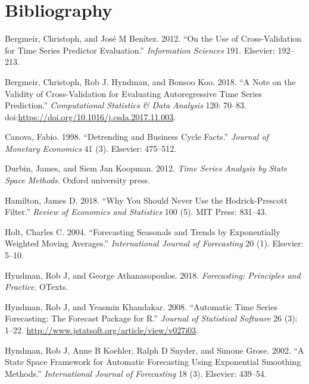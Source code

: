 \documentclass[]{article}
\begin{document}
\section*{Bibliography}\label{bibliography}

\hypertarget{refs}{}
\hypertarget{ref-bergmeir2012use}{}
Bergmeir, Christoph, and José M Benítez. 2012. ``On the Use of
Cross-Validation for Time Series Predictor Evaluation.''
\emph{Information Sciences} 191. Elsevier: 192--213.

\hypertarget{ref-bergmeir2018}{}
Bergmeir, Christoph, Rob J. Hyndman, and Bonsoo Koo. 2018. ``A Note on
the Validity of Cross-Validation for Evaluating Autoregressive Time
Series Prediction.'' \emph{Computational Statistics \& Data Analysis}
120: 70--83.
doi:\href{https://doi.org/https://doi.org/10.1016/j.csda.2017.11.003}{https://doi.org/10.1016/j.csda.2017.11.003}.

\hypertarget{ref-canova1998detrending}{}
Canova, Fabio. 1998. ``Detrending and Business Cycle Facts.''
\emph{Journal of Monetary Economics} 41 (3). Elsevier: 475--512.

\hypertarget{ref-durbin2012time}{}
Durbin, James, and Siem Jan Koopman. 2012. \emph{Time Series Analysis by
State Space Methods}. Oxford university press.

\hypertarget{ref-hamilton2018}{}
Hamilton, James D. 2018. ``Why You Should Never Use the Hodrick-Prescott
Filter.'' \emph{Review of Economics and Statistics} 100 (5). MIT Press:
831--43.

\hypertarget{ref-holt2004forecasting}{}
Holt, Charles C. 2004. ``Forecasting Seasonals and Trends by
Exponentially Weighted Moving Averages.'' \emph{International Journal of
Forecasting} 20 (1). Elsevier: 5--10.

\hypertarget{ref-hyndman2018forecasting}{}
Hyndman, Rob J, and George Athanasopoulos. 2018. \emph{Forecasting:
Principles and Practice}. OTexts.

\hypertarget{ref-hyndman2019}{}
Hyndman, Rob J, and Yeasmin Khandakar. 2008. ``Automatic Time Series
Forecasting: The Forecast Package for R.'' \emph{Journal of Statistical
Software} 26 (3): 1--22.
\url{http://www.jstatsoft.org/article/view/v027i03}.

\hypertarget{ref-hyndman2002state}{}
Hyndman, Rob J, Anne B Koehler, Ralph D Snyder, and Simone Grose. 2002.
``A State Space Framework for Automatic Forecasting Using Exponential
Smoothing Methods.'' \emph{International Journal of Forecasting} 18 (3).
Elsevier: 439--54.
\end{document}
